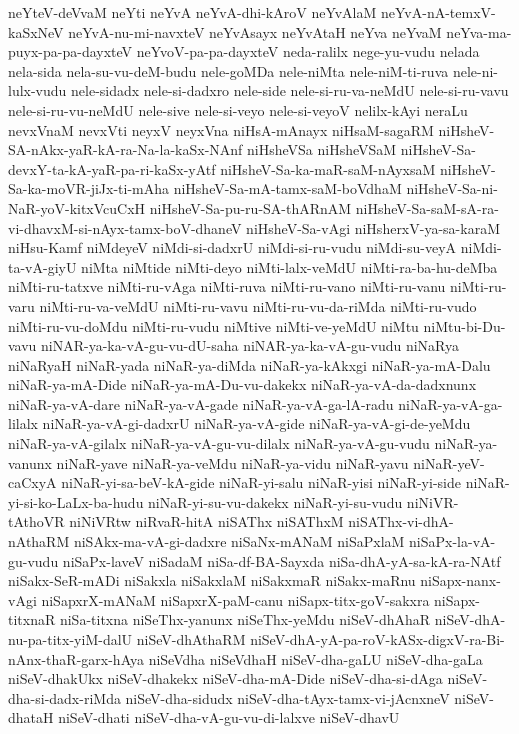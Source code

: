{neYteV-deVvaM
neYti
neYvA
neYvA-dhi-kAroV
neYvAlaM
neYvA-nA-temxV-kaSxNeV
neYvA-nu-mi-navxteV
neYvAsayx
neYvAtaH
neYva
neYvaM
neYva-ma-puyx-pa-pa-dayxteV
neYvoV-pa-pa-dayxteV
neda-ralilx
nege-yu-vudu
nelada
nela-sida
nela-su-vu-deM-budu
nele-goMDa
nele-niMta
nele-niM-ti-ruva
nele-ni-lulx-vudu
nele-sidadx
nele-si-dadxro
nele-side
nele-si-ru-va-neMdU
nele-si-ru-vavu
nele-si-ru-vu-neMdU
nele-sive
nele-si-veyo
nele-si-veyoV
nelilx-kAyi
neraLu
nevxVnaM
nevxVti
neyxV
neyxVna
niHsA-mAnayx
niHsaM-sagaRM
niHsheV-SA-nAkx-yaR-kA-ra-Na-la-kaSx-NAnf
niHsheVSa
niHsheVSaM
niHsheV-Sa-devxY-ta-kA-yaR-pa-ri-kaSx-yAtf
niHsheV-Sa-ka-maR-saM-nAyxsaM
niHsheV-Sa-ka-moVR-jiJx-ti-mAha
niHsheV-Sa-mA-tamx-saM-boVdhaM
niHsheV-Sa-ni-NaR-yoV-kitxVcuCxH
niHsheV-Sa-pu-ru-SA-thARnAM
niHsheV-Sa-saM-sA-ra-vi-dhavxM-si-nAyx-tamx-boV-dhaneV
niHsheV-Sa-vAgi
niHsherxV-ya-sa-karaM
niHsu-Kamf
niMdeyeV
niMdi-si-dadxrU
niMdi-si-ru-vudu
niMdi-su-veyA
niMdi-ta-vA-giyU
niMta
niMtide
niMti-deyo
niMti-lalx-veMdU
niMti-ra-ba-hu-deMba
niMti-ru-tatxve
niMti-ru-vAga
niMti-ruva
niMti-ru-vano
niMti-ru-vanu
niMti-ru-varu
niMti-ru-va-veMdU
niMti-ru-vavu
niMti-ru-vu-da-riMda
niMti-ru-vudo
niMti-ru-vu-doMdu
niMti-ru-vudu
niMtive
niMti-ve-yeMdU
niMtu
niMtu-bi-Du-vavu
niNAR-ya-ka-vA-gu-vu-dU-saha
niNAR-ya-ka-vA-gu-vudu
niNaRya
niNaRyaH
niNaR-yada
niNaR-ya-diMda
niNaR-ya-kAkxgi
niNaR-ya-mA-Dalu
niNaR-ya-mA-Dide
niNaR-ya-mA-Du-vu-dakekx
niNaR-ya-vA-da-dadxnunx
niNaR-ya-vA-dare
niNaR-ya-vA-gade
niNaR-ya-vA-ga-lA-radu
niNaR-ya-vA-ga-lilalx
niNaR-ya-vA-gi-dadxrU
niNaR-ya-vA-gide
niNaR-ya-vA-gi-de-yeMdu
niNaR-ya-vA-gilalx
niNaR-ya-vA-gu-vu-dilalx
niNaR-ya-vA-gu-vudu
niNaR-ya-vanunx
niNaR-yave
niNaR-ya-veMdu
niNaR-ya-vidu
niNaR-yavu
niNaR-yeV-caCxyA
niNaR-yi-sa-beV-kA-gide
niNaR-yi-salu
niNaR-yisi
niNaR-yi-side
niNaR-yi-si-ko-LaLx-ba-hudu
niNaR-yi-su-vu-dakekx
niNaR-yi-su-vudu
niNiVR-tAthoVR
niNiVRtw
niRvaR-hitA
niSAThx
niSAThxM
niSAThx-vi-dhA-nAthaRM
niSAkx-ma-vA-gi-dadxre
niSaNx-mANaM
niSaPxlaM
niSaPx-la-vA-gu-vudu
niSaPx-laveV
niSadaM
niSa-df-BA-Sayxda
niSa-dhA-yA-sa-kA-ra-NAtf
niSakx-SeR-mADi
niSakxla
niSakxlaM
niSakxmaR
niSakx-maRnu
niSapx-nanx-vAgi
niSapxrX-mANaM
niSapxrX-paM-canu
niSapx-titx-goV-sakxra
niSapx-titxnaR
niSa-titxna
niSeThx-yanunx
niSeThx-yeMdu
niSeV-dhAhaR
niSeV-dhA-nu-pa-titx-yiM-dalU
niSeV-dhAthaRM
niSeV-dhA-yA-pa-roV-kASx-digxV-ra-Bi-nAnx-thaR-garx-hAya
niSeVdha
niSeVdhaH
niSeV-dha-gaLU
niSeV-dha-gaLa
niSeV-dhakUkx
niSeV-dhakekx
niSeV-dha-mA-Dide
niSeV-dha-si-dAga
niSeV-dha-si-dadx-riMda
niSeV-dha-sidudx
niSeV-dha-tAyx-tamx-vi-jAcnxneV
niSeV-dhataH
niSeV-dhati
niSeV-dha-vA-gu-vu-di-lalxve
niSeV-dhavU
}
